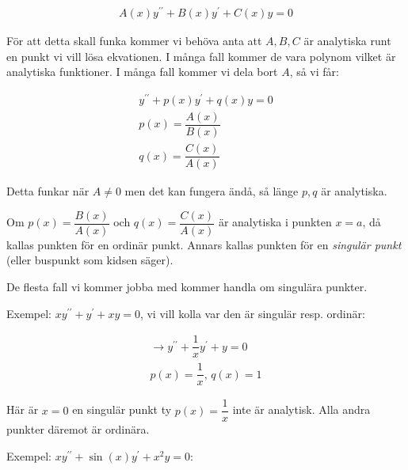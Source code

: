 \begin{equation*}
  \begin{gathered}
    A(x)y^{\prime\prime}+B(x)y^{\prime}+C(x)y=0
  \end{gathered}
\end{equation*}
\par\bigskip
\noindent För att detta skall funka kommer vi behöva anta att $A, B, C$ är analytiska runt en punkt vi vill lösa ekvationen. I många fall kommer de vara polynom vilket är analytiska funktioner. I många fall kommer vi dela bort $A$, så vi får:


\begin{equation*}
  \begin{gathered}
    y^{\prime\prime}+p(x)y^{\prime}+q(x)y =0\\
    p(x) = \dfrac{A(x)}{B(x)}\\
    q(x) = \dfrac{C(x)}{A(x)}
  \end{gathered}
\end{equation*}
\par\bigskip
\noindent Detta funkar när $A\neq0$ men det kan fungera ändå, så länge $p, q$ är analytiska.
\par\bigskip

\begin{theo}
  Om $p(x)=\dfrac{B(x)}{A(x)}$ och $q(x)=\dfrac{C(x)}{A(x)}$ är analytiska i punkten $x=a$, då kallas punkten för en ordinär punkt. Annars kallas punkten för en \textit{singulär punkt} (eller buspunkt som kidsen säger).
\end{theo}
\par\bigskip
\noindent De flesta fall vi kommer jobba med kommer handla om singulära punkter. 
\par\bigskip
\noindent Exempel: $xy^{\prime\prime}+y^{\prime}+xy = 0$, vi vill kolla var den är singulär resp. ordinär:


\begin{equation*}
  \begin{gathered}
    \rightarrow y^{\prime\prime}+\dfrac{1}{x}y^{\prime}+y=0\\
    p(x) = \dfrac{1}{x}\text{, } q(x)= 1
  \end{gathered}
\end{equation*}
\par\bigskip
\noindent Här är $x=0$ en singulär punkt ty $p(x)=\dfrac{1}{x}$ inte är analytisk. Alla andra punkter däremot är ordinära.
\par\bigskip
\noindent Exempel: $xy^{\prime\prime}+\sin(x)y^{\prime}+x^2y=0$:


